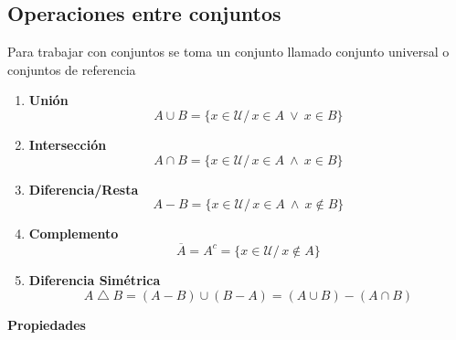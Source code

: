 \documentclass{article}
\newcommand{\lands}{\:\land\:}                          %
\newcommand{\tq}{/\,}                                   %
\newcommand{\vees}{\:\vee\:}                            %
\begin{document}
\subsection{Operaciones entre conjuntos}
Para trabajar con conjuntos se toma un conjunto llamado conjunto universal o conjuntos de referencia 
\begin{enumerate}
    \item \textbf{Unión}
    \begin{equation*}
        A \cup B = \{x \in \mathcal{U}\tq x \in A \vees x \in B\} 
    \end{equation*}
    \item \textbf{Intersección}
    \begin{equation*}
        A \cap B = \{x \in \mathcal{U}\tq x \in A \lands x \in B \}
    \end{equation*}
    \item \textbf{Diferencia/Resta} 
    \begin{equation*}
           A - B = \{x \in \mathcal{U}\tq x \in A \lands x \notin B \}
    \end{equation*}
    \item \textbf{Complemento}
    \begin{equation*}
        \overline{A}=A^c=\{x \in \mathcal{U}\tq x \notin A\}
    \end{equation*}
    \item \textbf{Diferencia Simétrica}
    \begin{equation*}
        A \bigtriangleup B = (A-B) \cup (B-A) = (A \cup B) - (A \cap B)
    \end{equation*}
\end{enumerate}
\textbf{Propiedades}
\end{document}
